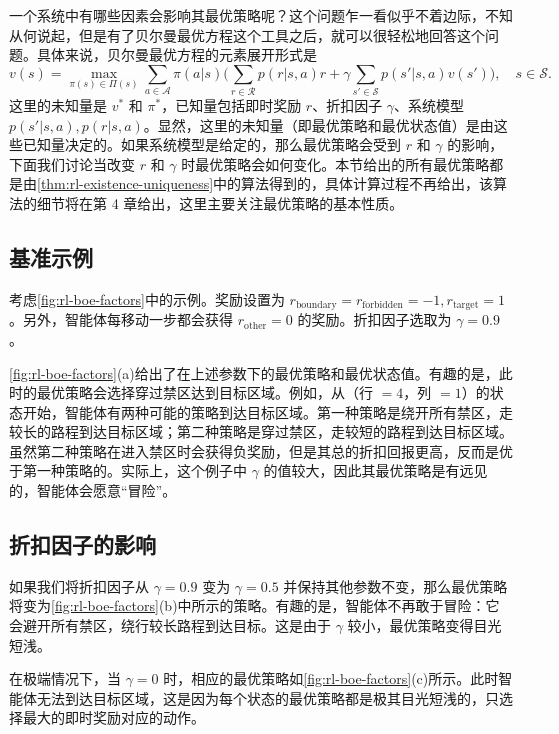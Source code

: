 一个系统中有哪些因素会影响其最优策略呢？这个问题乍一看似乎不着边际，不知从何说起，但是有了贝尔曼最优方程这个工具之后，就可以很轻松地回答这个问题。具体来说，贝尔曼最优方程的元素展开形式是
\begin{equation}
  v(s) = \max_{\pi(s) \in \varPi(s)} \sum_{a \in \mathcal{A}} \pi(a|s) \Biggl( \sum_{r \in \mathcal{R}} p(r|s,a) r + \gamma \sum_{s' \in \mathcal{S}} p(s'|s,a) v(s') \Biggr), \quad s \in \mathcal{S}.
\end{equation}
这里的未知量是 $v^*$ 和 $\pi^*$，已知量包括即时奖励 $r$、折扣因子 $\gamma$、系统模型 $p(s'|s,a), p(r|s,a)$。显然，这里的未知量（即最优策略和最优状态值）是由这些已知量决定的。如果系统模型是给定的，那么最优策略会受到 $r$ 和 $\gamma$ 的影响，下面我们讨论当改变 $r$ 和 $\gamma$ 时最优策略会如何变化。本节给出的所有最优策略都是由\cref{thm:rl-existence-uniqueness}中的算法得到的，具体计算过程不再给出，该算法的细节将在第 4 章给出，这里主要关注最优策略的基本性质。

\subsection*{基准示例}

考虑\cref{fig:rl-boe-factors}中的示例。奖励设置为 $r_{\mathrm{boundary}} = r_{\mathrm{forbidden}} = -1, r_{\mathrm{target}} = 1$。另外，智能体每移动一步都会获得 $r_{\mathrm{other}} = 0$ 的奖励。折扣因子选取为 $\gamma = 0.9$。

\cref{fig:rl-boe-factors}(a)给出了在上述参数下的最优策略和最优状态值。有趣的是，此时的最优策略会选择穿过禁区达到目标区域。例如，从（行 $=4$，列 $=1$）的状态开始，智能体有两种可能的策略到达目标区域。第一种策略是绕开所有禁区，走较长的路程到达目标区域；第二种策略是穿过禁区，走较短的路程到达目标区域。虽然第二种策略在进入禁区时会获得负奖励，但是其总的折扣回报更高，反而是优于第一种策略的。实际上，这个例子中 $\gamma$ 的值较大，因此其最优策略是有远见的，智能体会愿意“冒险”。

\subsection*{折扣因子的影响}

如果我们将折扣因子从 $\gamma = 0.9$ 变为 $\gamma = 0.5$ 并保持其他参数不变，那么最优策略将变为\cref{fig:rl-boe-factors}(b)中所示的策略。有趣的是，智能体不再敢于冒险：它会避开所有禁区，绕行较长路程到达目标。这是由于 $\gamma$ 较小，最优策略变得目光短浅。

在极端情况下，当 $\gamma = 0$ 时，相应的最优策略如\cref{fig:rl-boe-factors}(c)所示。此时智能体无法到达目标区域，这是因为每个状态的最优策略都是极其目光短浅的，只选择最大的即时奖励对应的动作。

